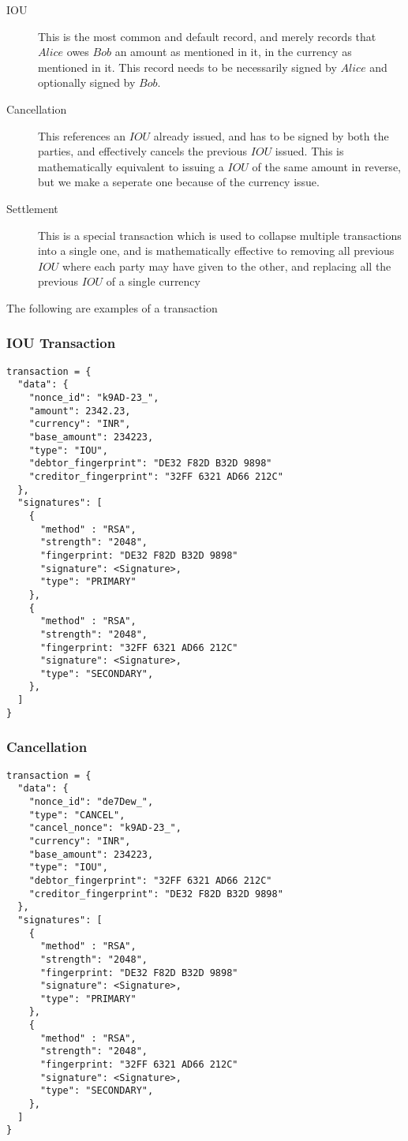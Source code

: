 \documentclass[12pt,a4paper]{article}
\begin{document}
\begin{description}
\item [IOU] This is the most common and default record, and merely records that $Alice$ owes $Bob$ an amount as mentioned in it, in the currency as mentioned in it. This record needs to be necessarily signed by $Alice$ and optionally signed by $Bob$.

\item [Cancellation] This references an $IOU$ already issued, and has to be signed by both the parties, and effectively cancels the previous $IOU$ issued. This is mathematically equivalent to issuing a $IOU$ of the same amount in reverse, but we make a seperate one because of the currency issue.
\item [Settlement] This is a special transaction which is used to collapse multiple transactions into a single one, and is mathematically effective to removing all previous $IOU$ where each party may have given to the other, and replacing all the previous $IOU$ of a single currency

\end{description}

The following are examples of a transaction

\subsubsection{IOU Transaction}
\begin{verbatim}
transaction = {
  "data": {
    "nonce_id": "k9AD-23_",    
    "amount": 2342.23,
    "currency": "INR",
    "base_amount": 234223,
    "type": "IOU",
    "debtor_fingerprint": "DE32 F82D B32D 9898"
    "creditor_fingerprint": "32FF 6321 AD66 212C"
  },
  "signatures": [
    {
      "method" : "RSA",
      "strength": "2048",
      "fingerprint: "DE32 F82D B32D 9898"
      "signature": <Signature>,
      "type": "PRIMARY"
    },
    {
      "method" : "RSA",
      "strength": "2048",
      "fingerprint: "32FF 6321 AD66 212C"
      "signature": <Signature>,
      "type": "SECONDARY",
    },
  ]
}
\end{verbatim}
\subsubsection{Cancellation}
\begin{verbatim}
transaction = {
  "data": {
    "nonce_id": "de7Dew_",
    "type": "CANCEL",
    "cancel_nonce": "k9AD-23_",
    "currency": "INR",
    "base_amount": 234223,
    "type": "IOU",
    "debtor_fingerprint": "32FF 6321 AD66 212C"
    "creditor_fingerprint": "DE32 F82D B32D 9898"
  },
  "signatures": [
    {
      "method" : "RSA",
      "strength": "2048",
      "fingerprint: "DE32 F82D B32D 9898"
      "signature": <Signature>,
      "type": "PRIMARY"
    },
    {
      "method" : "RSA",
      "strength": "2048",
      "fingerprint: "32FF 6321 AD66 212C"
      "signature": <Signature>,
      "type": "SECONDARY",
    },
  ]
}
\end{verbatim}
\end{document}
